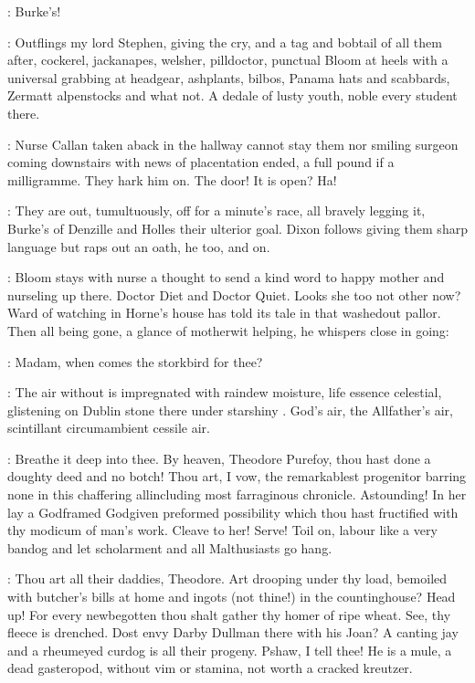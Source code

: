\documentclass[12pt]{article}
\begin{document}

\SD: Burke's!

: Outflings my lord Stephen, giving the cry, and a tag and bobtail
of all them after, cockerel, jackanapes, welsher, pilldoctor, punctual
Bloom at heels with a universal grabbing at headgear, ashplants, bilbos,
Panama hats and scabbards, Zermatt alpenstocks and what not. A dedale of
lusty youth, noble every student there.

: Nurse Callan taken aback in the hallway cannot stay them nor smiling
surgeon coming downstairs with news of placentation ended, a full pound if
a milligramme. They hark him on. The door! It is open? Ha!

: They are out, tumultuously, off for a minute's race, all bravely
legging it, Burke's of Denzille and Holles their ulterior goal. Dixon
follows giving them sharp language but raps out an oath, he too, and on.

: Bloom stays with nurse a thought to send a kind
word to happy mother and nurseling up there. Doctor Diet and Doctor
Quiet. Looks she too not other now? Ward of watching in Horne's house has
told its tale in that washedout pallor. Then all being gone, a glance of
motherwit helping, he whispers close in going:

\Bl: Madam, when comes the storkbird for thee?

: The air without is impregnated with raindew moisture, life essence
celestial, glistening on Dublin stone there under starshiny .
God's air, the Allfather's air, scintillant circumambient cessile air.

: Breathe it deep into thee. By heaven, Theodore Purefoy, thou hast
done a doughty deed and no botch! Thou art, I vow, the remarkablest
progenitor barring none in this chaffering allincluding most farraginous
chronicle. Astounding! In her lay a Godframed Godgiven preformed
possibility which thou hast fructified with thy modicum of man's work.
Cleave to her! Serve! Toil on, labour like a very bandog and let
scholarment and all Malthusiasts go hang.

: Thou art all their daddies, Theodore. Art drooping
under thy load, bemoiled with butcher's bills at home and ingots (not
thine!) in the countinghouse? Head up! For every newbegotten thou shalt
gather thy homer of ripe wheat. See, thy fleece is drenched. Dost envy
Darby Dullman there with his Joan? A canting jay and a rheumeyed curdog
is all their progeny. Pshaw, I tell thee! He is a mule, a dead
gasteropod, without vim or stamina, not worth a cracked kreutzer.
\end{document}
